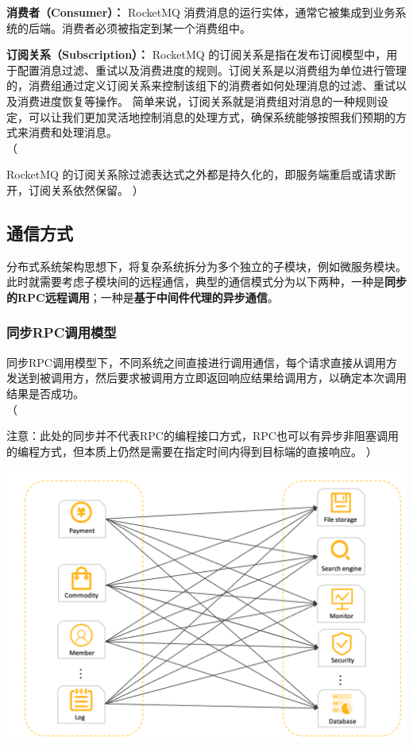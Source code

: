 \documentclass[11pt, a4paper, oneside, fontset=none]{ctexbook}
\newenvironment{ignore}{%
  \color{gray}%
  \ignorespaces%
  （%
}{%
  ）%
  \ignorespacesafterend%
}
\begin{document}
\textbf{消费者（Consumer）：}
RocketMQ 消费消息的运行实体，通常它被集成到业务系统的后端。消费者必须被指定到某一个消费组中。

\textbf{订阅关系（Subscription）：}
RocketMQ 的订阅关系是指在发布订阅模型中，用于配置消息过滤、重试以及消费进度的规则。订阅关系是以消费组为单位进行管理的，消费组通过定义订阅关系来控制该组下的消费者如何处理消息的过滤、重试以及消费进度恢复等操作。
简单来说，订阅关系就是消费组对消息的一种规则设定，可以让我们更加灵活地控制消息的处理方式，确保系统能够按照我们预期的方式来消费和处理消息。\\
\begin{ignore}
  RocketMQ 的订阅关系除过滤表达式之外都是持久化的，即服务端重启或请求断开，订阅关系依然保留。
\end{ignore}

\subsection{通信方式}
分布式系统架构思想下，将复杂系统拆分为多个独立的子模块，例如微服务模块。此时就需要考虑子模块间的远程通信，典型的通信模式分为以下两种，一种是{\bfseries\kaishu 同步的RPC远程调用}；一种是{\bfseries\kaishu 基于中间件代理的异步通信}。

\subsubsection{同步RPC调用模型}
同步RPC调用模型下，不同系统之间直接进行调用通信，每个请求直接从调用方发送到被调用方，然后要求被调用方立即返回响应结果给调用方，以确定本次调用结果是否成功。\\
\begin{ignore}
  注意：此处的同步并不代表RPC的编程接口方式，RPC也可以有异步非阻塞调用的编程方式，但本质上仍然是需要在指定时间内得到目标端的直接响应。
\end{ignore}

\begin{center}
  \begin{minipage}{\textwidth}
    \center
    \includegraphics[width=\textwidth]{picture/同步RPC调用模型.png}
    \captionsetup{hypcap=false}
    \label{fig:同步RPC调用模型}
  \end{minipage}
\end{center}
\end{document}
